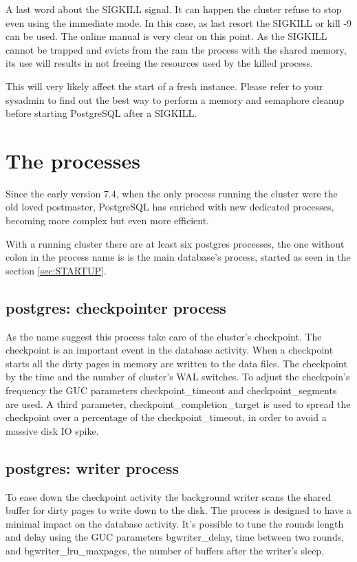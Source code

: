 A last word about the SIGKILL signal. It can happen the cluster refuse to stop 
even using the immediate mode. In this case, as last resort the SIGKILL or kill 
-9 can be used. The online manual is very clear on this point. As the SIGKILL 
cannot be trapped and evicts from the ram the process with the shared memory, 
its use will results in not freeing the resources used by the killed process.

This will very likely affect the start of a fresh instance. Please refer to 
your sysadmin to find out the best way to perform a memory and semaphore 
cleanup before starting PostgreSQL after a SIGKILL. 


\section{The processes}
\label{sec:PROCESSES}
Since the early version 7.4, when the only process running the cluster were the 
old loved postmaster, PostgreSQL has enriched with new dedicated processes, 
becoming more complex but even more efficient.

With a running cluster there are at least six postgres processes, the one 
without colon in the process name is is the main database's process, started 
as seen in the section \ref{sec:STARTUP}.


\subsection{postgres: checkpointer process}
As the name suggest this process take care of the cluster's 
checkpoint. The checkpoint is an important event in the 
database activity. When a checkpoint starts all the dirty 
pages in memory are written to the data files. 
The checkpoint by the time and the number of cluster's WAL switches.
To adjust the checkpoin's frequency the GUC parameters checkpoint\_timeout and 
checkpoint\_segments are used. A third parameter, 
checkpoint\_completion\_target is used to spread the checkpoint over a 
percentage of the checkpoint\_timeout, in order to avoid a massive disk IO 
spike.

\subsection{postgres: writer process}
To ease down the checkpoint activity the background writer scans the shared 
buffer for dirty pages to write down to the disk. The process is designed to 
have a minimal impact on the database activity. It's possible to tune the rounds
length and delay using the GUC parameters bgwriter\_delay, time between two 
rounds, and bgwriter\_lru\_maxpages, the number of buffers after the writer's 
sleep.


